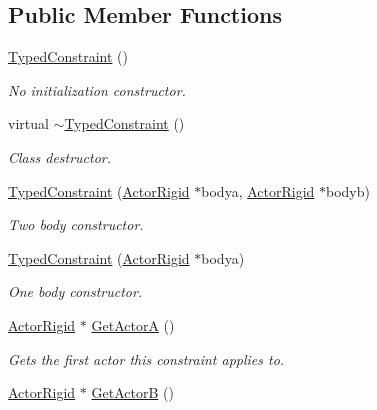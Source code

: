\subsection*{Public Member Functions}
\begin{DoxyCompactItemize}
\item 
\hyperlink{classphys_1_1TypedConstraint_a499e2f94ca4ee111001efa0dd3862391}{TypedConstraint} ()
\begin{DoxyCompactList}\small\item\em No initialization constructor. \item\end{DoxyCompactList}\item 
virtual \hyperlink{classphys_1_1TypedConstraint_abf1cb6e3cf5c62feac31805162ec2766}{$\sim$TypedConstraint} ()
\begin{DoxyCompactList}\small\item\em Class destructor. \item\end{DoxyCompactList}\item 
\hyperlink{classphys_1_1TypedConstraint_a50ca8631a6c75bbc609c8d4ed61fdcee}{TypedConstraint} (\hyperlink{classphys_1_1ActorRigid}{ActorRigid} $\ast$bodya, \hyperlink{classphys_1_1ActorRigid}{ActorRigid} $\ast$bodyb)
\begin{DoxyCompactList}\small\item\em Two body constructor. \item\end{DoxyCompactList}\item 
\hyperlink{classphys_1_1TypedConstraint_a41ad08bfde377e91f2b37b0af40a9d34}{TypedConstraint} (\hyperlink{classphys_1_1ActorRigid}{ActorRigid} $\ast$bodya)
\begin{DoxyCompactList}\small\item\em One body constructor. \item\end{DoxyCompactList}\item 
\hyperlink{classphys_1_1ActorRigid}{ActorRigid} $\ast$ \hyperlink{classphys_1_1TypedConstraint_aae01815d877566ae4e100bb481ed2f5e}{GetActorA} ()
\begin{DoxyCompactList}\small\item\em Gets the first actor this constraint applies to. \item\end{DoxyCompactList}\item 
\hyperlink{classphys_1_1ActorRigid}{ActorRigid} $\ast$ \hyperlink{classphys_1_1TypedConstraint_a5d988a4d724ed77ca846417d466e9e1a}{GetActorB} ()

\end{DoxyCompactItemize}
